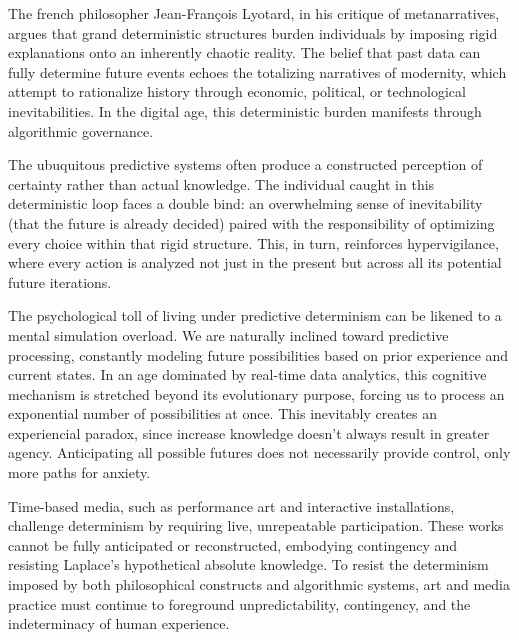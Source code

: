 The french philosopher Jean-François Lyotard, in his critique of metanarratives, argues that grand deterministic structures burden individuals by imposing rigid explanations onto an inherently chaotic reality\citep{lyotard1979}. The belief that past data can fully determine future events echoes the totalizing narratives of modernity, which attempt to rationalize history through economic, political, or technological inevitabilities. In the digital age, this deterministic burden manifests through algorithmic governance. 

The ubuquitous predictive systems often produce a constructed perception of certainty rather than actual knowledge. The individual caught in this deterministic loop faces a double bind: an overwhelming sense of inevitability (that the future is already decided) paired with the responsibility of optimizing every choice within that rigid structure. This, in turn, reinforces hypervigilance, where every action is analyzed not just in the present but across all its potential future iterations.

% 
The psychological toll of living under predictive determinism can be likened to a mental simulation overload.
We are naturally inclined toward predictive processing, constantly modeling future possibilities based on prior experience and current states. In an age dominated by real-time data analytics, this cognitive mechanism is stretched beyond its evolutionary purpose, forcing us to process an exponential number of possibilities at once. This inevitably creates an experiencial paradox, since increase knowledge doesn't always result in greater agency. Anticipating all possible futures does not necessarily provide control, only more paths for anxiety.
% 

%
Time-based media, such as performance art and interactive installations, challenge determinism by requiring live, unrepeatable participation. These works cannot be fully anticipated or reconstructed, embodying contingency and resisting Laplace's hypothetical absolute knowledge. To resist the determinism imposed by both philosophical constructs and algorithmic systems, art and media practice must continue to foreground unpredictability, contingency, and the indeterminacy of human experience.

